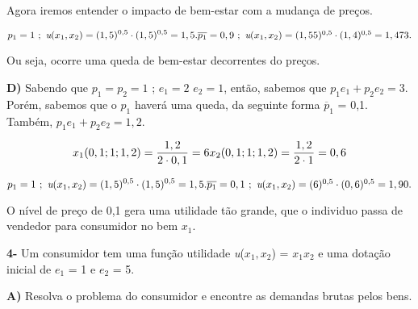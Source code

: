 \documentclass[a4paper, 12pt]{article} %
\begin{document}
\begin{flushleft}
\begin{center}
Agora iremos entender o impacto de bem-estar com a mudança de preços.
\end{center}

\begin{equation}
p_{1} = 1 \ ; \ \textit{u}(x_{1}, x_{2}) = (1,5)^{0,5} \cdot (1,5)^{0,5} = 1,5. 
$$\\$$
\overline{p_{1}} = 0,9 \ ; \ \textit{u}(x_{1}, x_{2}) = (1,55)^{0,5} \cdot (1,4)^{0,5} = 1,473.
\end{equation}

\begin{center}
Ou seja, ocorre uma queda de bem-estar decorrentes do preços.
\end{center}

\singlespacing

\textbf{D)}  Sabendo que $p_{1} = p_{2} = 1$ ; $\textit{e}_{1} = 2$  $\textit{e}_{2} = 1$, então, sabemos que $p_{1}\textit{e}_{1} + p_{2}\textit{e}_{2} = 3$. Porém, sabemos que o $p_{1}$ haverá uma queda, da seguinte forma $\overline{p}_{1}$ = 0,1. Também, $p_{1}\textit{e}_{1} + p_{2}\textit{e}_{2} = 1,2$.

\begin{equation}
x_{1}(0,1;1;1,2) = \dfrac{1,2}{2 \cdot 0,1} = 6
$$\\$$
x_{2}(0,1;1;1,2) = \dfrac{1,2}{2 \cdot 1} = 0,6
\end{equation}

\begin{equation}
p_{1} = 1 \ ; \ \textit{u}(x_{1}, x_{2}) = (1,5)^{0,5} \cdot (1,5)^{0,5} = 1,5. 
$$\\$$
\overline{p_{1}} = 0,1 \ ; \ \textit{u}(x_{1}, x_{2}) = (6)^{0,5} \cdot (0,6)^{0,5} = 1,90.
\end{equation}

\begin{center}
O nível de preço de 0,1 gera uma utilidade tão grande, que o individuo passa de vendedor para consumidor no bem $x_{1}$.
\end{center}


\singlespacing


\textbf{4-} Um consumidor tem uma função utilidade \textit{u}($x_{1}, x_{2}$) = $x_{1}x_{2}$ e uma dotação inicial de $\textit{e}_{1}$ = 1 e $\textit{e}_{2}$ = 5.

\singlespacing

\textbf{A)} Resolva o problema do consumidor e encontre as demandas brutas pelos bens.

\singlespacing


\end{flushleft}
\end{document}
